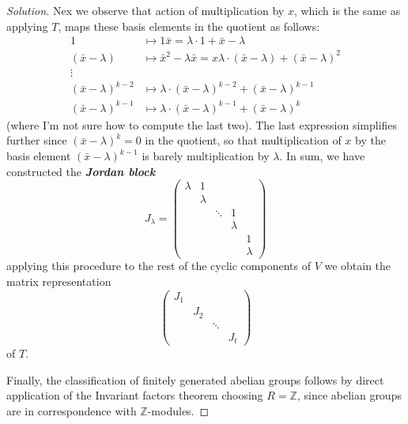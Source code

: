 \begin{proof}[Solution]
Nex we observe that action of multiplication by $x$, which is the same as applying $T$, maps these basis elements in the quotient as follows:
\begin{align*}
	1&\mapsto 1\bar{x}=\lambda\cdot 1+\bar{x}-\lambda\\
	(\bar{x}-\lambda)&\mapsto \bar{x}^2-\lambda\bar{x}=x\lambda\cdot (\bar{x}-\lambda)+(\bar{x}-\lambda)^2\\
	\vdots & \\
	(\bar{x}-\lambda)^{k-2}&\mapsto \lambda\cdot (\bar{x}-\lambda)^{k-2}+(\bar{x}-\lambda)^{k-1}\\
	(\bar{x}-\lambda)^{k-1}&\mapsto \lambda\cdot (\bar{x}-\lambda)^{k-1}+(\bar{x}-\lambda)^k
\end{align*}
(where I'm not sure how to compute the last two). The last expression simplifies further since $(\bar{x}-\lambda)^k=0$ in the quotient, so that multiplication of $x$ by the basis element $( \bar{x}-\lambda)^{k-1}$ is barely multiplication by $\lambda$. In sum, we have constructed the  \textit{\textbf{Jordan block}}
\[J_{\lambda}=\begin{pmatrix} \lambda &1\\
&\lambda\\
&&\ddots&1\\
&&&\lambda\\
&&&&1\\
&&&&\lambda
\end{pmatrix} \]
applying this procedure to the rest of the cyclic components of $V$ we obtain the  matrix representation
 \[\begin{pmatrix} J_1\\
 &J_2\\
 &&\ddots\\
 &&&J_t\end{pmatrix} \]
of $T$.

Finally, the classification of finitely generated abelian groups follows by direct application of the Invariant factors theorem choosing $R=\mathbb{Z}$, since abelian groups are in correspondence with $\mathbb{Z}$-modules.
\end{proof}

